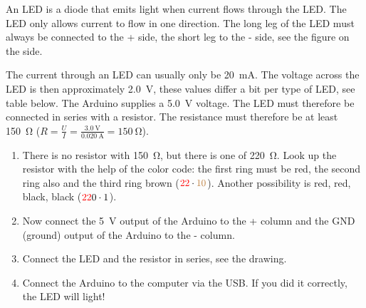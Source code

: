 \documentclass{arduino}
\begin{document}
An LED is a diode that emits light when current flows through the LED. The LED only allows current to flow in one direction. The long leg of the LED must always be connected to the + side, the short leg to the - side, see the figure on the side.

The current through an LED can usually only be \SI{20}{\milli\ampere}. The voltage across the LED is then approximately \SI{2.0}{\volt}, these values ​​differ a bit per type of LED, see table below. The Arduino supplies a \SI{5.0}{\volt} voltage. The LED must therefore be connected in series with a resistor. The resistance must therefore be at least \SI{150}{\ohm} ($R = \frac{U}{I} = \frac{\SI{3.0}{\volt}}{\SI{0.020}{\ampere}} = \SI{150}{\ohm}$).


\begin{enumerate}
\item There is no resistor with \SI{150}{\ohm}, but there is one of \SI{220}{\ohm}. Look up the resistor with the help of the color code: the first ring must be red, the second ring also and the third ring brown ($\textcolor{red}{2}\textcolor{red}{2} \cdot \textcolor{brown}{10}$). Another possibility is red, red, black, black ($\textcolor{red}{2}\textcolor{red}{2}\textcolor{black}{0} \cdot \textcolor{black}{1}$).

\item Now connect the \SI{5}{\volt} output of the Arduino to the + column and the GND (ground) output of the Arduino to the - column.

\item Connect the LED and the resistor in series, see the drawing.

\item Connect the Arduino to the computer via the USB. If you did it correctly, the LED will light!
\end{enumerate}
\end{document}
